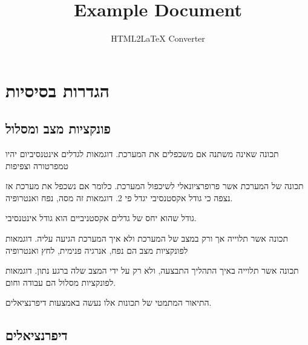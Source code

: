 \documentclass{tstextbook}
\begin{document}
\title{Example Document}
\author{HTML2LaTeX Converter}
\maketitle

\chapter{הגדרות בסיסיות}

\section{פונקציות מצב ומסלול}

\begin{definition}
תכונה שאינה משתנה אם משכפלים את המערכת. דוגמאות לגדלים אינטנסיביום יהיו טמפרטורה וצפיפות

\end{definition}
\begin{definition}
תכונה של המערכת אשר פרופרציונאלי לשיכפול המערכת. כלומר אם נשכפל את מערכת אז נצפה כי גודל אקסטנסיבי יגדל פי 2. דוגמאות זה מסה, נפח ואנטרופיה.

\end{definition}
\begin{proposition}
גודל שהוא יחס של גדלים אקסטניביים הוא גודל אינטנסיבי.

\end{proposition}
\begin{definition}
תכונה אשר תלוייה אך ורק במצב של המערכת ולא איך המערכת הגיעה עליה. דוגמאות לפונקציות מצב הם נפח, אנרגיה פנימית, לחץ ואנטרופיה

\end{definition}
\begin{definition}
תכונה אשר תלוייה באיך התהליך התבצעה, ולא רק על ידי המצב שלה ברגע נתון. דוגמאות לפונקציות מסלול הם עבודה וחום.

\end{definition}
התיאור המתמטי של תכונות אלו נעשה באמצעות דיפרנציאלים.

\section{דיפרנציאלים}
\end{document}
